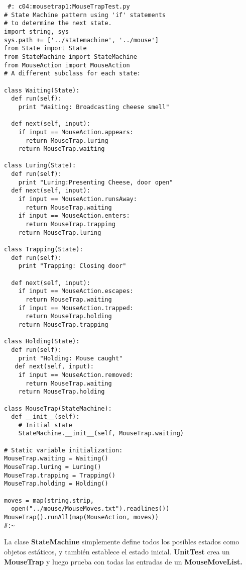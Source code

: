 \begin{lstlisting}  
 #: c04:mousetrap1:MouseTrapTest.py 
# State Machine pattern using 'if' statements 
# to determine the next state. 
import string, sys 
sys.path += ['../statemachine', '../mouse'] 
from State import State 
from StateMachine import StateMachine 
from MouseAction import MouseAction 
# A different subclass for each state:

class Waiting(State): 
  def run(self):  
    print "Waiting: Broadcasting cheese smell" 
    
  def next(self, input): 
    if input == MouseAction.appears: 
      return MouseTrap.luring 
    return MouseTrap.waiting 
    
class Luring(State): 
  def run(self): 
    print "Luring:Presenting Cheese, door open" 
  def next(self, input): 
    if input == MouseAction.runsAway: 
      return MouseTrap.waiting 
    if input == MouseAction.enters: 
      return MouseTrap.trapping 
    return MouseTrap.luring 
    
class Trapping(State): 
  def run(self): 
    print "Trapping: Closing door"
    
  def next(self, input): 
    if input == MouseAction.escapes: 
      return MouseTrap.waiting 
    if input == MouseAction.trapped: 
      return MouseTrap.holding 
    return MouseTrap.trapping 
    
class Holding(State): 
  def run(self): 
    print "Holding: Mouse caught" 
   def next(self, input): 
    if input == MouseAction.removed: 
      return MouseTrap.waiting 
    return MouseTrap.holding 
    
class MouseTrap(StateMachine): 
  def __init__(self):  
    # Initial state 
    StateMachine.__init__(self, MouseTrap.waiting) 
    
# Static variable initialization: 
MouseTrap.waiting = Waiting() 
MouseTrap.luring = Luring() 
MouseTrap.trapping = Trapping() 
MouseTrap.holding = Holding() 

moves = map(string.strip,  
  open("../mouse/MouseMoves.txt").readlines()) 
MouseTrap().runAll(map(MouseAction, moves)) 
#:~ 
  \end{lstlisting}
  
  La clase \textbf{StateMachine} simplemente define todos los posibles estados como objetos estáticos, y también establece el estado inicial. \textbf{UnitTest} crea un \textbf{MouseTrap} y luego prueba con todas las entradas de un \textbf{MouseMoveList.}    \newline
  
